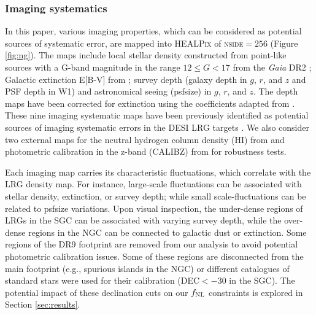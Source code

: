 \subsubsection{Imaging systematics}
In this paper, various imaging properties, which can be considered as potential sources of systematic error, are mapped into \textsc{HEALPix} of \textsc{nside}$=256$ (Figure \ref{fig:ng}). The maps include local stellar density constructed from point-like sources with a G-band magnitude in the range $12 \leq G < 17$ from the \textit{Gaia} DR2 \citep[see,][]{gaiadr2, myers2022}; Galactic extinction E[B-V] from \cite{schlegel1998maps}; survey depth (galaxy depth in $g$, $r$, and $z$ and PSF depth in W1) and astronomical seeing (psfsize) in $g$, $r$, and $z$. The depth maps have been corrected for extinction using the coefficients adapted from \cite{2011ApJ...737..103S}. These nine imaging systematic maps have been previously identified as potential sources of imaging systematic errors in the DESI LRG targets \citep{zhou2022target}. We also consider two external maps for the neutral hydrogen column density (HI) from \cite{2016A&A...594A.116H} and photometric calibration in the z-band (CALIBZ) from  for robustness tests.

Each imaging map carries its characteristic fluctuations, which correlate with the LRG density map. For instance, large-scale fluctuations can be associated with stellar density, extinction, or survey depth; while small scale-fluctuations can be related to psfsize variations. Upon visual inspection, the under-dense regions of LRGs in the SGC can be associated with varying survey depth, while the over-dense regions in the NGC can be connected to galactic dust or extinction. Some regions of the DR9 footprint are removed from our analysis to avoid potential photometric calibration issues. Some of these regions are disconnected from the main footprint (e.g., spurious islands in the NGC) or different catalogues of standard stars were used for their calibration (DEC$<-30$ in the SGC). The potential impact of these declination cuts on our $f_{\rm NL}$ constraints is explored in Section \ref{sec:results}. 

